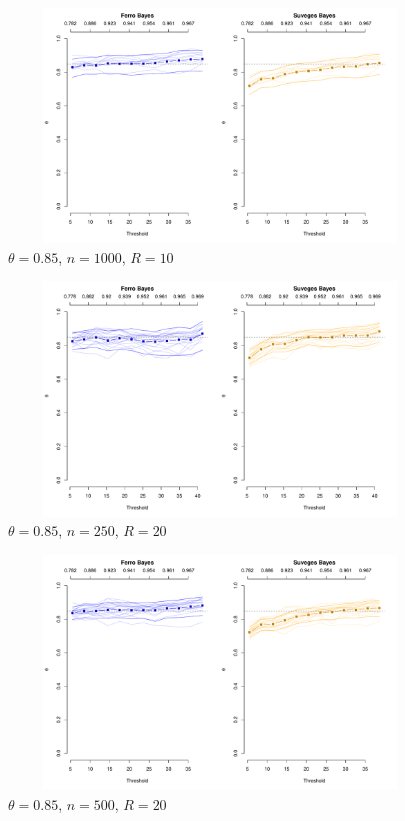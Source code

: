 \documentclass[12pt]{article}
\begin{document}
\begin{figure}
\begin{center}
\includegraphics[width=5.5in, height=2.45in]{../extremal_comparison/figs/sim_frechet_hier_85_1000_10.pdf}
\caption{$\theta=0.85$, $n=1000$, $R=10$}
\end{center}
\end{figure}

\newpage

\begin{figure}
\begin{center}
\includegraphics[width=5.5in, height=2.45in]{../extremal_comparison/figs/sim_frechet_hier_85_250_20.pdf}
\caption{$\theta=0.85$, $n=250$, $R=20$}
\end{center}
\end{figure}

\begin{figure}
\begin{center}
\includegraphics[width=5.5in, height=2.45in]{../extremal_comparison/figs/sim_frechet_hier_85_500_20.pdf}
\caption{$\theta=0.85$, $n=500$, $R=20$}
\end{center}
\end{figure}
\end{document}
